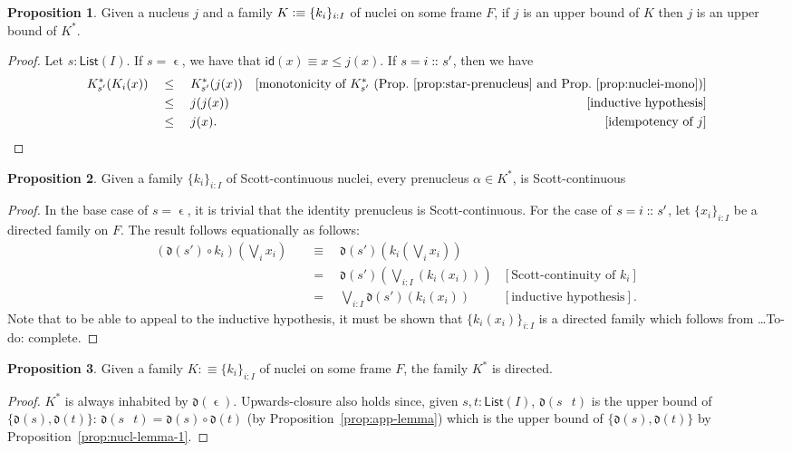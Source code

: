 \documentclass[a4paper, 11pt]{article}
\theoremstyle{definition}
\newtheorem{prop}{Proposition}
\newcommand{\is}{\vcentcolon\equiv}
\DeclareMathOperator{\emptyl}{\epsilon}
\DeclareMathOperator{\cons}{\colon\kern-1.1ex\colon\kern-0.4ex}
\DeclareMathOperator{\append}{\,}
\newcommand{\dd}[1]{\mathfrak{d}(#1)}
\newcommand{\todo}[1]{{\large\color{orange}\textsf{To-do: #1.}}}
\begin{document}
\begin{prop}\label{prop:star-ub}
  Given a nucleus $j$ and a family $K \is \{ k_i \}_{i : I}$ of nuclei on some frame $F$, if $j$ is
  an upper bound of $K$ then $j$ is an upper bound of $K^*$.
\end{prop}
\begin{proof}
  Let $s : \mathsf{List}(I)$. If $s = \emptyl$, we have that $\mathsf{id}(x) \equiv x \le j(x)$.
  If $s = i \cons s'$, then we have
  \begin{align*}
       K^*_{s'}(K_i(x))
  \quad&\le\quad K^*_{s'}(j(x)) & [\text{monotonicity of $K^*_{s'}$ (Prop.~\ref{prop:star-prenucleus} and Prop.~\ref{prop:nuclei-mono})}] \\
  \quad&\le\quad j(j(x))        & [\text{inductive hypothesis}] \\
  \quad&\le\quad j(x).          & [\text{idempotency of $j$}]
  \end{align*}
\end{proof}

\begin{prop}
  Given a family $\{ k_i \}_{i : I}$ of Scott-continuous nuclei, every
  prenucleus $\alpha \in K^*$, is Scott-continuous
\end{prop}
\begin{proof}
  In the base case of $s = \emptyl$, it is trivial that the identity
  prenucleus is Scott-continuous. For the case of $s = i \cons s'$, let
  $\{ x_i \}_{i : I}$ be a directed family on $F$. The result follows equationally
  as follows:
  \begin{align*}
    (\dd{s'} \circ k_i) \left(\bigvee_i x_i\right)
    &\quad\equiv\quad \dd{s'}\left(k_i \left( \bigvee_i x_i \right)\right) & \\
    &\quad=\quad \dd{s'}\left(\bigvee_{i : I} \left( k_i(x_i) \right)\right) & [\text{Scott-continuity of $k_i$}]\\
    &\quad=\quad \bigvee_{i : I} \dd{s'}(k_i(x_i)) & [\text{inductive hypothesis}].
  \end{align*}
  Note that to be able to appeal to the inductive hypothesis, it must be shown that
  $\{ k_i(x_i) \}_{i : I}$ is a directed family which follows from \ldots \todo{complete}
\end{proof}

\begin{prop}
  Given a family $K :\equiv \{ k_i \}_{i : I}$ of nuclei on some frame $F$, the family $K^*$ is directed.
\end{prop}
\begin{proof}
  $K^*$ is always inhabited by $\dd{\emptyl}$. Upwards-closure also holds since, given $s, t :
  \mathsf{List}(I)$, $\dd{s \append t}$ is the upper bound of $\{ \dd{s}, \dd{t} \}$:
  $\dd{s \append t} = \dd{s} \circ \dd{t}$ (by Proposition~\ref{prop:app-lemma}) which is the upper
  bound of $\{ \dd{s}, \dd{t} \}$ by Proposition~\ref{prop:nucl-lemma-1}.
\end{proof}
\end{document}
